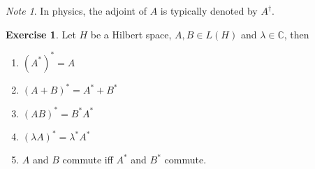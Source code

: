 \documentclass[12pt]{amsart}
\theoremstyle{definition}
\theoremstyle{remark}
\newtheorem{note}[remark]{Note}
\theoremstyle{definition}
\newtheorem{ex}[definition]{Exercise}
\newcommand{\lam}{\lambda}
\newcommand{\C}{\mathbb{C}}
\begin{document}
\begin{note}
	In physics, the adjoint of $A$ is typically denoted by $A^{\dagger}$.
\end{note}

\begin{ex}
	Let $H$ be a Hilbert space, $A, B \in L(H)$ and $\lam \in \C$, then \begin{enumerate}
		\item $(A^{*})^{*} = A$
		\item $(A + B)^{*} = A^{*} + B^{*}$
		\item $(AB)^{*} = B^{*}A^{*}$
		\item $(\lam A)^{*} = \lam^*A^{*}$
		\item $A$ and $B$ commute iff $A^{*}$ and $B^{*}$ commute.
	\end{enumerate}
\end{ex}
\end{document}
